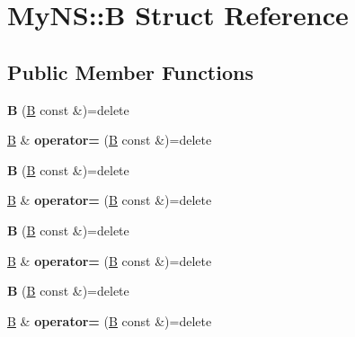 \hypertarget{struct_my_n_s_1_1_b}{}\section{My\+NS\+:\+:B Struct Reference}
\label{struct_my_n_s_1_1_b}
\subsection*{Public Member Functions}
\begin{DoxyCompactItemize}
\item 
\mbox{\label{struct_my_n_s_1_1_b_aa4b3e8f2f4c64d7cb4675532ea63b021}} 
{\bfseries B} (\mbox{\hyperlink{struct_my_n_s_1_1_b}{B}} const \&)=delete
\item 
\mbox{\label{struct_my_n_s_1_1_b_a1b02680a0eaf1288d550b35e97f59caf}} 
\mbox{\hyperlink{struct_my_n_s_1_1_b}{B}} \& {\bfseries operator=} (\mbox{\hyperlink{struct_my_n_s_1_1_b}{B}} const \&)=delete
\item 
\mbox{\label{struct_my_n_s_1_1_b_aa4b3e8f2f4c64d7cb4675532ea63b021}} 
{\bfseries B} (\mbox{\hyperlink{struct_my_n_s_1_1_b}{B}} const \&)=delete
\item 
\mbox{\label{struct_my_n_s_1_1_b_a1b02680a0eaf1288d550b35e97f59caf}} 
\mbox{\hyperlink{struct_my_n_s_1_1_b}{B}} \& {\bfseries operator=} (\mbox{\hyperlink{struct_my_n_s_1_1_b}{B}} const \&)=delete
\item 
\mbox{\label{struct_my_n_s_1_1_b_aa4b3e8f2f4c64d7cb4675532ea63b021}} 
{\bfseries B} (\mbox{\hyperlink{struct_my_n_s_1_1_b}{B}} const \&)=delete
\item 
\mbox{\label{struct_my_n_s_1_1_b_a1b02680a0eaf1288d550b35e97f59caf}} 
\mbox{\hyperlink{struct_my_n_s_1_1_b}{B}} \& {\bfseries operator=} (\mbox{\hyperlink{struct_my_n_s_1_1_b}{B}} const \&)=delete
\item 
\mbox{\label{struct_my_n_s_1_1_b_aa4b3e8f2f4c64d7cb4675532ea63b021}} 
{\bfseries B} (\mbox{\hyperlink{struct_my_n_s_1_1_b}{B}} const \&)=delete
\item 
\mbox{\label{struct_my_n_s_1_1_b_a1b02680a0eaf1288d550b35e97f59caf}} 
\mbox{\hyperlink{struct_my_n_s_1_1_b}{B}} \& {\bfseries operator=} (\mbox{\hyperlink{struct_my_n_s_1_1_b}{B}} const \&)=delete
\end{DoxyCompactItemize}


